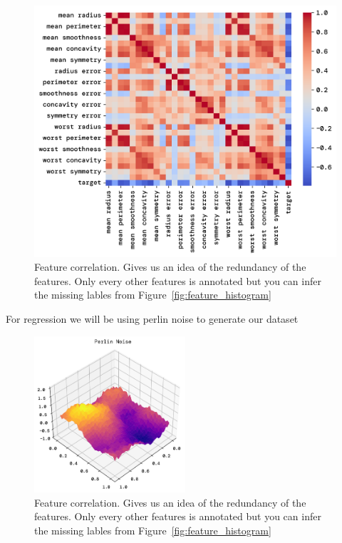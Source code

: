 \documentclass[twoside,11pt]{report}
\begin{document}
\begin{figure}
    \begin{center}
        \includegraphics[width=\textwidth]{../runsAndFigures/feature_correlation.png}
    \end{center}
    \caption{Feature correlation. Gives us an idea of the redundancy of the features.
        Only every other features is annotated but you can infer the missing lables 
    from Figure~\ref{fig:feature_histogram}}\label{fig:feature_correlation}
\end{figure}


For regression we will be using perlin noise to generate our dataset 

\begin{figure}
    \begin{center}
        \includegraphics[width=0.5\textwidth]{../runsAndFigures/perlinNoise.png}
    \end{center}
    \caption{Feature correlation. Gives us an idea of the redundancy of the features.
        Only every other features is annotated but you can infer the missing lables 
    from Figure~\ref{fig:feature_histogram}}\label{fig:feature_correlation}
\end{figure}
\end{document}
